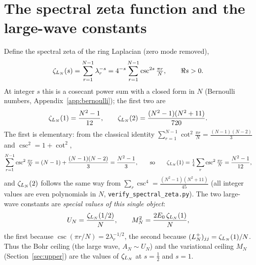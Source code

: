 \section{The spectral zeta function and the large-wave constants}\label{sec:zeta}

Define the spectral zeta of the ring Laplacian (zero mode removed),
\begin{equation}\label{eq:zeta}
  \zeta_{L_N}(s)=\sum_{r=1}^{N-1}\lambda_r^{-s}=4^{-s}\sum_{r=1}^{N-1}\csc^{2s}\tfrac{\pi r}{N},
  \qquad \Re s>0 .
\end{equation}
At integer $s$ this is a cosecant power sum with a closed form in $N$ (Bernoulli numbers,
Appendix~\ref{app:bernoulli}); the first two are
\[
  \zeta_{L_N}(1)=\frac{N^2-1}{12},\qquad \zeta_{L_N}(2)=\frac{(N^2-1)(N^2+11)}{720}.
\]
The first is elementary: from the classical identity $\sum_{r=1}^{N-1}\cot^2\frac{\pi r}{N}=\frac{(N-1)(N-2)}3$
and $\csc^2=1+\cot^2$,
\[
  \sum_{r=1}^{N-1}\csc^2\tfrac{\pi r}{N}=(N-1)+\frac{(N-1)(N-2)}3=\frac{N^2-1}3,
  \qquad\text{so}\qquad \zeta_{L_N}(1)=\tfrac14\sum_{r}\csc^2\tfrac{\pi r}{N}=\frac{N^2-1}{12},
\]
and $\zeta_{L_N}(2)$ follows the same way from $\sum_r\csc^4=\frac{(N^2-1)(N^2+11)}{45}$ (all integer values
are even polynomials in $N$, \texttt{verify\_spectral\_zeta.py}).
The two large-wave constants are \emph{special values of this single object}:
\begin{equation}\label{eq:zeta-values}
  U_N=\frac{\zeta_{L_N}(1/2)}{N},\qquad M_N^2=\frac{2E_0\,\zeta_{L_N}(1)}{N},
\end{equation}
the first because $\csc(\pi r/N)=2\lambda_r^{-1/2}$, the second because $(L_N^{+})_{jj}=\zeta_{L_N}(1)/N$.
Thus the Bohr ceiling (the large wave, $A_N\sim U_N$) and the variational ceiling $M_N$
(Section~\ref{sec:upper}) are the values of $\zeta_{L_N}$ at $s=\tfrac12$ and $s=1$.

